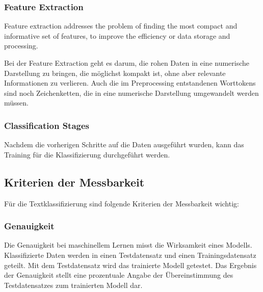 \subsubsection{Feature Extraction}
\begin{definition}
	\label{def:feature-extraction}
	\glqq Feature extraction addresses the problem of finding the most compact and informative set of features, to improve the efficiency or data storage and processing.\grqq{} \citep{Guyon2006}
\end{definition}
Bei der Feature Extraction geht es darum, die rohen Daten in eine numerische Darstellung zu bringen, die möglichst kompakt ist, ohne aber relevante Informationen zu verlieren.
Auch die im Preprocessing entstandenen Worttokens sind noch Zeichenketten, die in eine numerische Darstellung umgewandelt werden müssen.

\subsubsection{Classification Stages}
Nachdem die vorherigen Schritte auf die Daten ausgeführt wurden, kann das Training für die Klassifizierung durchgeführt werden.

\subsection{Kriterien der Messbarkeit}
\label{c:conception:classification:criteria}
Für die Textklassifizierung sind folgende Kriterien der Messbarkeit wichtig:

\subsubsection{Genauigkeit}
Die Genauigkeit bei maschinellem Lernen misst die Wirksamkeit eines Modells. Klassifizierte Daten werden in einen Testdatensatz und einen Trainingsdatensatz geteilt. Mit dem Testdatensatz wird das trainierte Modell getestet. Das Ergebnis der Genauigkeit stellt eine prozentuale Angabe der Übereinstimmung des Testdatensatzes zum trainierten Modell dar. \citep[vgl.][]{select_ml_2021}

